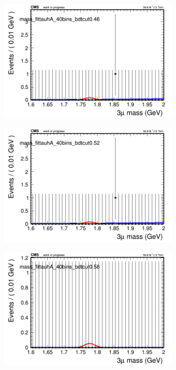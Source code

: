 \begin{figure}[H]
\begin{subfigure}{0.2\textwidth}
        \includegraphics[width=\textwidth]{power_law/plots/tauhA/massfit_tauhA_40bins_bdtcut0.46.png}
        \caption{}
    \end{subfigure}
    \begin{subfigure}{0.2\textwidth}
        \includegraphics[width=\textwidth]{power_law/plots/tauhA/massfit_tauhA_40bins_bdtcut0.52.png}
        \caption{}
    \end{subfigure}
    \begin{subfigure}{0.2\textwidth}
        \includegraphics[width=\textwidth]{power_law/plots/tauhA/massfit_tauhA_40bins_bdtcut0.58.png}

\end{subfigure}
\end{figure}
